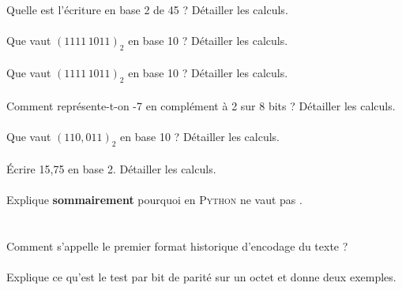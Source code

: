 \documentclass[a4paper,10pt,french]{article}
\begin{document}

\\


Quelle est l'écriture en base 2 de 45 ? Détailler les calculs.\\

\\

Que vaut $(1111\,1011)_2$ en base 10 ? Détailler les calculs.\\

\\

Que vaut $(1111\,1011)_2$ en base 10 ? Détailler les calculs.\\

\\

Comment représente-t-on -7 en complément à 2 sur 8 bits ? Détailler les calculs.\\

 \\
\newpage
Que vaut $(110,011)_2$ en base 10 ? Détailler les calculs.\\

 \\

\'Ecrire 15,75 en base 2. Détailler les calculs.\\

 \\

Explique \textbf{sommairement} pourquoi en \textsc{Python}  ne vaut pas .\\

 \\


\\


Comment s'appelle le premier format historique d'encodage du texte ?\\

 \\

Explique ce qu'est le test par bit de parité sur un octet et donne deux exemples.\\

\\
\end{document}
